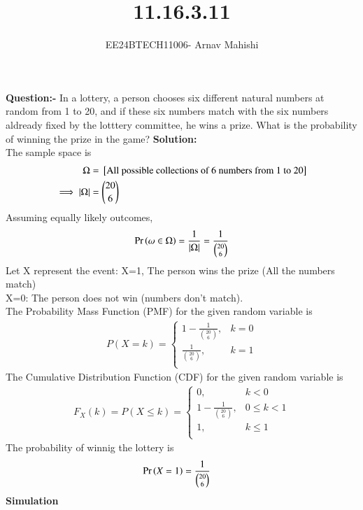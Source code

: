 \documentclass[journal]{IEEEtran}
\numberwithin{equation}{enumi}
\numberwithin{figure}{enumi}
\begin{document}

\title{11.16.3.11}
\author{EE24BTECH11006- Arnav Mahishi}
{\let\newpage\relax\maketitle}
\textbf{Question:-} In a lottery, a person chooses six different natural numbers at random from 1 to 20, and if these six numbers match with the six numbers aldready fixed by the lotttery committee, he wins a prize. What is the probability of winning the prize in the game?
\textbf{Solution: }\\
The sample space is 
\begin{align}
  \Omega &= {}\left[\text{All possible collections of 6 numbers from 1 to 20}\right]\\
  \implies\left\vert\Omega\right\vert&=\binom{20}{6}
\end{align}
Assuming equally likely outcomes, 
\begin{align}
  \Pr\left(\omega \in \Omega\right) = \frac{1}{\left\vert\Omega\right\vert}=\frac{1}{\binom{20}{6}}
\end{align}
Let X represent the event:\newline
X=1, The person wins the prize (All the numbers match)\\
X=0: The person does not win (numbers don't match).\\
The Probability Mass Function (PMF) for the given random variable is
\begin{align}
P(X = k) =
\begin{cases}
	1-\frac{1}{\binom{20}{6}}, & k = 0 \\
	\frac{1}{\binom{20}{6}}, & k = 1 \\
\end{cases}
\end{align}
The Cumulative Distribution Function (CDF) for the given random variable is
\begin{align}
F_X(k) = P(X \le k) = 
\begin{cases}
	0, & k < 0 \\
	1-\frac{1}{\binom{20}{6}}, & 0 \le k < 1 \\
	1, & k \le 1\\
\end{cases}
\end{align}
The probability of winnig the lottery is
\begin{align}
  \Pr\left(X=1\right) &= \frac{1}{\binom{20}{6}}
\end{align}
\textbf{Simulation}
\end{document}
